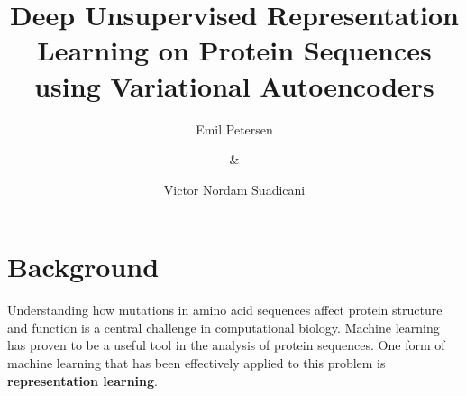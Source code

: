 \documentclass[a4paper,11pt]{article}
\title{\vspace{-1.5cm}Deep Unsupervised Representation Learning on Protein Sequences using Variational Autoencoders}
\author{Emil Petersen \and \& \and Victor Nordam Suadicani}
\begin{document}
\maketitle











\section*{Background}
Understanding how mutations in amino acid sequences affect protein structure and function is a central challenge in computational biology. Machine learning has proven to be a useful tool in the analysis of protein sequences. One form of machine learning that has been effectively applied to this problem is \textbf{representation learning}.
\end{document}
